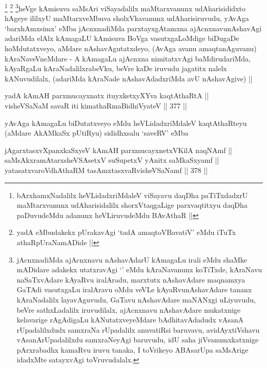 \begin{artha}
\footnote{bArxhamxNadalilx heVLidadxriMdaleV viSayavu daqDha
  paTiTxdadxrU maMtarxvanunx udAharisidalilx shorxVtaqgaLige
  parxvaqtitxyu daqDha paDuvudeMdu adanunx heVLiruvudeMdu BAvAthaR ||}
\footnote{yadA eMbudakekx pUrakavAgi `tadA amaqtoVBavatiV' eMdu iTuTx
  athaRpUraNamADide ||}
\footnote{jAcnxnadiMda ajAcnxnavu nAshavAdarU kAmagaLu irali eMdu
  shaMke mADidare adakekx utatxravAgi `\stext' eMdu kAraNavanunx
  koTiTxde, kAraNavu naSaTxvAdare kAyaRvu iralAradu, marxtutx
  nAshavAdare maqnamxya GaTAdi vasutxgaLu iralAravu oMdu veVLe
  kAyaRvunAshavAdare tananx kAraNadalilx layavAguvudu, GaTavu
  nAshavAdare maNANxgi uLiyuvudu, beVre sathxLadalilx iruvudilalx,
  ajAcnxnavu nAshavAdare mukatxnige kelavarige rAgAdigaLu
  kANutatxveyeMdare bAdhitavAdadudx vAsanA rUpadalilxdudx samxraNa
  rUpadalilx anuvatiRsi baruvavu, avidAyxtiVshavu vAsanArUpadalilxdu
  samxraNeyAgi baruvudu, idU saha jiVvanumxkatxnige pArxrabadhx
  kamaRvu iruvu tanaka, I toVrikeyo ABAsarUpa saMsArige idadxMte
  satayxvAgi toVruvudalalx.}heVge kAmisuva saMsAri viSayadalilx maMtarxvanunx udAharisididxto
hAgeye ililxyU maMtarxveMbuva sholxVkavanunx udAharisiruvudu, yAvAga
`barxhAmxsimx' eMba jAcnxnadiMda parxtayxgAtamxna ajAcnxnavunAshavAgi
adariMda elAlx kAmagaLU kAmisuva BoVga vasutxgaLoMdige biDugaDe
hoMdutatxveyo, aMdare nAshavAgutatxdeyo, (AvAga avanu amaqtanAguvanu)
kAraNaveVneMdare - A kAmagaLu ajAcnxna nimitatxvAgi baMdirudariMda,
kAyaRgaLu kAraNadalilxrabeVku, beVre kaDe iruvudu jagatitx nalelx
kANuvudilalx, (adariMda kAraNade nAshavAdadxriMda avU nAshavAgive) ||
\end{artha}


\begin{shl}
yadA kAmAH parxmucayxnatx ituyxketxyXYva kaqtAthaRtA || \\
visheVSaNaM savaR iti kimathaRmaBidhiVyateV ||  377 ||  
\end{shl}

\begin{artha}
yAvAga kAmagaLu biDutatxveyo eMdu heVLidadxriMdaleV kaqtAthaRteyu
(aMdare AkAMkaSx pUtiRyu) sididhxsalu `saveRV' eMba
\end{artha}


\begin{shl}
jAgarxtasxvXpanxkaSxyeV kAmAH parxmucayxnetxV\s KilA naqNAmf || \\
saMsAkxramAtarxsheVSAsetxV suSupetxV yAnitx saMkaSxyamf || \\
yatasatxvaroVdhAthaRM tasAmxtasxvaRvisheVSaNamf ||  378 ||  
\end{shl}

